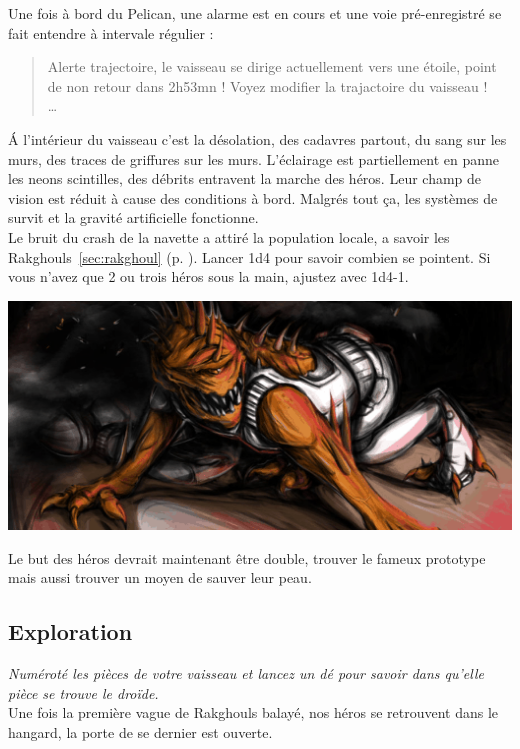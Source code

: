 Une fois à bord du Pelican, une alarme est en cours et une voie pré-enregistré se fait entendre à intervale régulier :

\begin{quote}
	Alerte trajectoire, le vaisseau se dirige actuellement vers une étoile, point de non retour dans 2h53mn ! 
	Voyez modifier la trajactoire du vaisseau !\\ 
	\ldots
\end{quote}

\'A l'intérieur du vaisseau c'est la désolation, des cadavres partout, du sang sur les murs, des traces de griffures sur les murs. L'éclairage est partiellement en panne les neons scintilles, des débrits entravent la marche des héros. Leur champ de vision est réduit à cause des conditions à bord. Malgrés tout ça, les systèmes de survit et la gravité artificielle fonctionne.\\

Le bruit du crash de la navette a attiré la population locale, a savoir les Rakghouls~\ref{sec:rakghoul} (p. \pageref{sec:rakghoul}). Lancer 1d4 pour savoir combien se pointent. Si vous n'avez que 2 ou trois héros sous la main, ajustez avec 1d4-1.

\noindent\includegraphics[width=\linewidth]{_img/dos-au-muur/rakghoul.png}

Le but des héros devrait maintenant être double, trouver le fameux prototype mais aussi trouver un moyen de sauver leur peau. 

\subsection{Exploration}
\emph{Numéroté les pièces de votre vaisseau et lancez un dé pour savoir dans qu'elle pièce se trouve le droïde.}\\

Une fois la première vague de Rakghouls balayé, nos héros se retrouvent dans le hangard, la porte de se dernier est ouverte.

